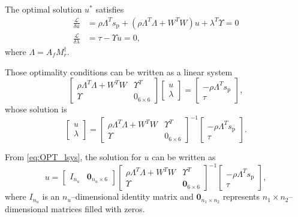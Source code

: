 \documentclass{gmto}
\begin{document}
The optimal solution $u^\ast$ satisfies
%
\begin{align*}
    \frac{\mathcal{L}}{\delta u} & = 
    \rho \Lambda^T s_{\text{p}} + \left(\rho\Lambda^T\Lambda + W^TW\right) u 
    + \lambda^T \Upsilon = 0 \\
    \frac{\mathcal{L}}{\delta \lambda} & = \tau - \Upsilon u = 0 ,
\end{align*}
where $\Lambda = A_f M_r^\dagger$.

Those optimality conditions can be written as a linear system
\[
\begin{bmatrix}
\rho \Lambda^T\Lambda + W^TW & \Upsilon^T \\ \Upsilon & 0_{6 \times 6}
\end{bmatrix}
\begin{bmatrix}
u \\ \lambda
\end{bmatrix}
=
\begin{bmatrix}
- \rho \Lambda^T s_{\text{p}} \\ \tau
\end{bmatrix} ,
\]
whose solution is
\begin{equation}
\label{eq:OPT_lsys}
\begin{bmatrix}
u \\ \lambda
\end{bmatrix}
=
\begin{bmatrix}
\rho \Lambda^T\Lambda + W^TW & \Upsilon^T \\ \Upsilon & 0_{6 \times 6}
\end{bmatrix}^{-1}
\begin{bmatrix}
- \rho \Lambda^T s_{\text{p}} \\ \tau
\end{bmatrix}.
\end{equation}

From \eqref{eq:OPT_lsys}, the solution for $u$ can be written as
\[
u = 
\begin{bmatrix}
I_{n_u} & \mathbf{0}_{n_u \times 6}
\end{bmatrix}
\begin{bmatrix}
\rho \Lambda^T\Lambda + W^TW & \Upsilon^T \\ \Upsilon & \mathbf{0}_{6 \times 6}
\end{bmatrix}^{-1} \begin{bmatrix}
- \rho \Lambda^T s_{\text{p}} \\ \tau
\end{bmatrix},
\]
where $I_{n_u}$ is an $n_u$--dimensional identity matrix and $\mathbf{0}_{n_1 \times n_2}$ represents $n_1 \times n_2$--dimensional matrices filled with zeros.
\end{document}
